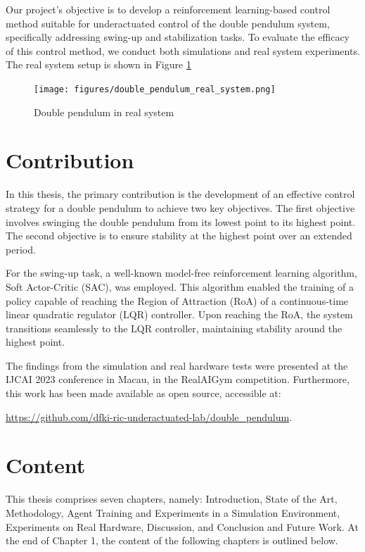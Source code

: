 Our project's objective is to develop a reinforcement learning-based control method suitable for underactuated control of the double pendulum system, specifically addressing swing-up and stabilization tasks. To evaluate the efficacy of this control method, we conduct both simulations and real system experiments. The real system setup is shown in Figure \ref{fig:double_pendulum_real_system}

\begin{figure}[H]
    \centering
    \texttt{[image: figures/double\_pendulum\_real\_system.png]}
    \caption{Double pendulum in real system}
    \label{fig:double_pendulum_real_system}
\end{figure}

\section{Contribution}
In this thesis, the primary contribution is the development of an effective control strategy for a double pendulum to achieve two key objectives. The first objective involves swinging the double pendulum from its lowest point to its highest point. The second objective is to ensure stability at the highest point over an extended period.

For the swing-up task, a well-known model-free reinforcement learning algorithm, Soft Actor-Critic (SAC), was employed\cite{haarnoja2018soft}. This algorithm enabled the training of a policy capable of reaching the Region of Attraction (RoA) of a continuous-time linear quadratic regulator (LQR) controller\cite{lehtomaki1981robustness}. Upon reaching the RoA, the system transitions seamlessly to the LQR controller, maintaining stability around the highest point.

The findings from the simulation and real hardware tests were presented at the IJCAI 2023 conference in Macau, in the RealAIGym competition\cite{dfki_ric_underactuated_lab_2023}. Furthermore, this work has been made available as open source, accessible at:

\url{https://github.com/dfki-ric-underactuated-lab/double_pendulum}.

\section{Content}
This thesis comprises seven chapters, namely: Introduction, State of the Art, Methodology, Agent Training and Experiments in a Simulation Environment, Experiments on Real Hardware, Discussion, and Conclusion and Future Work. At the end of Chapter 1, the content of the following chapters is outlined below.

